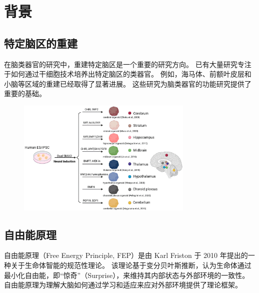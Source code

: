 \chapter{背景}\label{chap:background}

\section{特定脑区的重建}\label{sec:brain-region-reconstruction}
在脑类器官的研究中，重建特定脑区是一个重要的研究方向\cite{Kim2023}。
已有大量研究专注于如何通过干细胞技术培养出特定脑区的类器官。
例如，海马体、前额叶皮层和小脑等区域的重建已经取得了显著进展。
这些研究为脑类器官的功能研究提供了重要的基础。

\begin{figure}[!htbp]
    \centering
    \includegraphics[width=0.75\textwidth]{Img/brain-organoids-regisons.png}
    \label{fig:brain-organoids-regisons}
\end{figure}

\section{自由能原理}\label{sec:free-energy-principle}
自由能原理（Free Energy Principle, FEP）是由 Karl Friston 于 2010 年提出的一种关于生命体智能的规范性理论\cite{Friston2010}。
该理论基于变分贝叶斯推断，认为生命体通过最小化自由能，即“惊奇”（Surprise），来维持其内部状态与外部环境的一致性。
自由能原理为理解大脑如何通过学习和适应来应对外部环境提供了理论框架。

